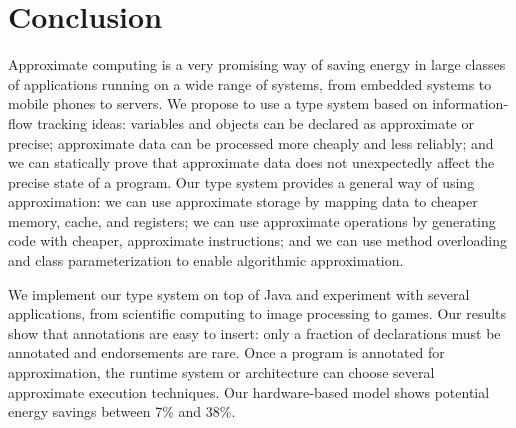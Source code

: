 \section{Conclusion}
\label{sec:conc}

Approximate computing is a very promising way of saving energy in
large classes of applications running on a wide range of systems, from
embedded systems to mobile phones to servers. We propose to use
a type system based on information-flow tracking ideas: variables and
objects can be declared as approximate or precise; approximate data can
be processed more cheaply and less reliably; and we can statically
prove that approximate data does not unexpectedly affect the precise
state of a program.
Our type system provides a general way of using approximation:
we can use approximate storage by mapping data to cheaper memory,
cache, and registers; we can use approximate operations by generating
code with cheaper, approximate instructions; and we can use method
overloading and class parameterization to enable algorithmic
approximation.

We implement our type system on top of Java and experiment with
several applications, from scientific computing to image processing to
games. Our results show that annotations are easy to insert:
only a fraction of declarations must be annotated and endorsements are
rare. Once a program is annotated for approximation, the runtime
system or architecture can choose several approximate execution
techniques. Our hardware-based model shows potential energy savings
between 7\% and 38\%.
